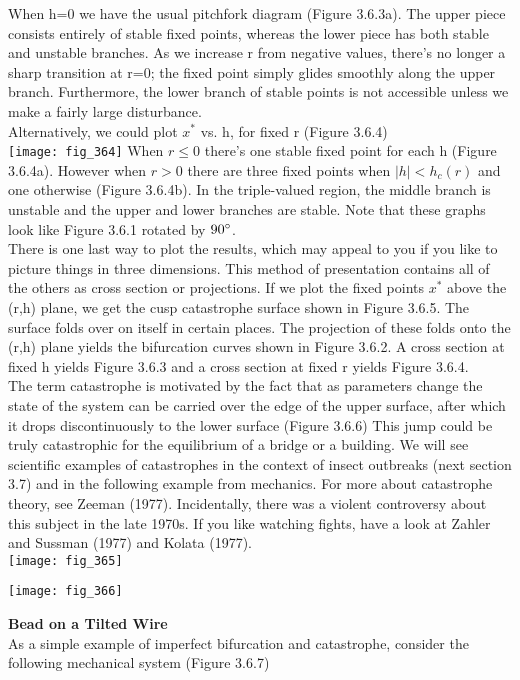 \documentclass{article}
\newcommand\tab[1][1cm]{\hspace*{#1}}
\begin{document}
When h=0 we have the usual pitchfork diagram (Figure 3.6.3a). The upper piece consists entirely of stable fixed points, whereas the lower piece has both stable and unstable branches. As we increase r from negative values, there's no longer a sharp transition at r=0; the fixed point simply glides smoothly along the upper branch. Furthermore, the lower branch of stable points is not accessible unless we make a fairly large disturbance. \\ \tab
Alternatively, we could plot $x^{*}$ vs. h, for fixed r (Figure 3.6.4)
\\
\texttt{[image: fig\_364]}
When $r \leq 0$ there's one stable fixed point for each h (Figure 3.6.4a). However when $r>0$ there are three fixed points when $|h|< h_{c}(r)$ and one otherwise (Figure 3.6.4b). In the triple-valued region, the middle branch is unstable and the upper and lower branches are stable. Note that these graphs look like Figure 3.6.1 rotated by $90\degree$. \\ \tab
There is one last way to plot the results, which may appeal to you if you like to picture things in three dimensions. This method of presentation contains all of the others as cross section or projections. If we plot the fixed points $x^{*}$ above the (r,h) plane, we get the cusp catastrophe surface shown in Figure 3.6.5. The surface folds over on itself in certain places. The projection of these folds onto the (r,h) plane yields the bifurcation curves shown in Figure 3.6.2. A cross section at fixed h yields Figure 3.6.3 and a cross section at fixed r yields Figure 3.6.4. \\ \tab The term catastrophe is motivated by the fact that as parameters change the state of the system can be carried over the edge of the upper surface, after which it drops discontinuously to the lower surface (Figure 3.6.6) This jump could be truly catastrophic for the equilibrium of a bridge or a building. We will see scientific examples of catastrophes in the context of insect outbreaks (next section 3.7) and in the following example from mechanics. For more about catastrophe theory, see Zeeman (1977). Incidentally, there was a violent controversy about this subject in the late 1970s. If you like watching fights, have a look at Zahler and Sussman (1977) and Kolata (1977).
\\
\texttt{[image: fig\_365]}

\texttt{[image: fig\_366]}

\textbf {Bead on a Tilted Wire}
\\ \tab As a simple example of imperfect bifurcation and catastrophe, consider the following mechanical system (Figure 3.6.7) \\ 
\end{document}

